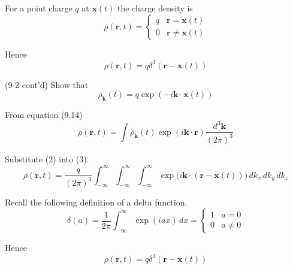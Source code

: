 


For a point charge $q$ at $\mathbf x(t)$ the charge density is
\begin{equation*}
\rho(\mathbf r,t)
=\begin{cases}
q & \mathbf r=\mathbf x(t)
\\
0 & \mathbf r\ne\mathbf x(t)
\end{cases}
\end{equation*}

Hence
\begin{equation*}
\rho(\mathbf r,t)=q\delta^3(\mathbf r-\mathbf x(t))
\tag{1}
\end{equation*}

(9-2 cont'd)
Show that
\begin{equation*}
\rho_{\mathbf k}(t)=q\exp(-i\mathbf k\cdot\mathbf x(t))
\tag{2}
\end{equation*}

From equation (9.14)
\begin{equation*}
\rho(\mathbf r,t)=\int\rho_{\mathbf k}(t)
\exp(i\mathbf k\cdot\mathbf r)
\frac{d^3\mathbf k}{(2\pi)^3}
\tag{3}
\end{equation*}

Substitute (2) into (3).
\begin{equation*}
\rho(\mathbf r,t)=\frac{q}{(2\pi)^3}
\int_{-\infty}^\infty
\int_{-\infty}^\infty
\int_{-\infty}^\infty
\exp\big(i\mathbf k\cdot(\mathbf r-\mathbf x(t))\big)
\,dk_x\,dk_y\,dk_z
\end{equation*}

Recall the following definition of a delta function.
\begin{equation*}
\delta(a)=\frac{1}{2\pi}\int_{-\infty}^\infty\exp(iax)\,dx
=\begin{cases}
1 & a=0
\\
0 & a\ne0
\end{cases}
\end{equation*}

Hence
\begin{equation*}
\rho(\mathbf r,t)=q\delta^3(\mathbf r-\mathbf x(t))
\end{equation*}

